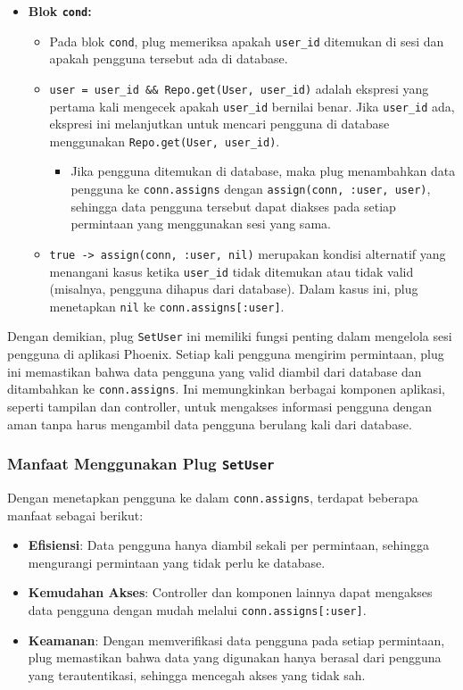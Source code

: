 \begin{itemize}
	\item \textbf{Blok \texttt{cond}:} 
	\begin{itemize}
		\item Pada blok \texttt{cond}, plug memeriksa apakah \texttt{user\_id} ditemukan di sesi dan apakah pengguna tersebut ada di database.
		\item \texttt{user = user\_id \&\& Repo.get(User, user\_id)} adalah ekspresi yang pertama kali mengecek apakah \texttt{user\_id} bernilai benar. Jika \texttt{user\_id} ada, ekspresi ini melanjutkan untuk mencari pengguna di database menggunakan \texttt{Repo.get(User, user\_id)}.
		\begin{itemize}
			\item Jika pengguna ditemukan di database, maka plug menambahkan data pengguna ke \texttt{conn.assigns} dengan \texttt{assign(conn, :user, user)}, sehingga data pengguna tersebut dapat diakses pada setiap permintaan yang menggunakan sesi yang sama.
		\end{itemize}
		\item \texttt{true -> assign(conn, :user, nil)} merupakan kondisi alternatif yang menangani kasus ketika \texttt{user\_id} tidak ditemukan atau tidak valid (misalnya, pengguna dihapus dari database). Dalam kasus ini, plug menetapkan \texttt{nil} ke \texttt{conn.assigns[:user]}.
	\end{itemize}
\end{itemize}

Dengan demikian, plug \texttt{SetUser} ini memiliki fungsi penting dalam mengelola sesi pengguna di aplikasi Phoenix. Setiap kali pengguna mengirim permintaan, plug ini memastikan bahwa data pengguna yang valid diambil dari database dan ditambahkan ke \texttt{conn.assigns}. Ini memungkinkan berbagai komponen aplikasi, seperti tampilan dan controller, untuk mengakses informasi pengguna dengan aman tanpa harus mengambil data pengguna berulang kali dari database.

\subsubsection{Manfaat Menggunakan Plug \texttt{SetUser}}
Dengan menetapkan pengguna ke dalam \texttt{conn.assigns}, terdapat beberapa manfaat sebagai berikut:
\begin{itemize}
	\item \textbf{Efisiensi}: Data pengguna hanya diambil sekali per permintaan, sehingga mengurangi permintaan yang tidak perlu ke database.
	\item \textbf{Kemudahan Akses}: Controller dan komponen lainnya dapat mengakses data pengguna dengan mudah melalui \texttt{conn.assigns[:user]}.
	\item \textbf{Keamanan}: Dengan memverifikasi data pengguna pada setiap permintaan, plug memastikan bahwa data yang digunakan hanya berasal dari pengguna yang terautentikasi, sehingga mencegah akses yang tidak sah.
\end{itemize}


